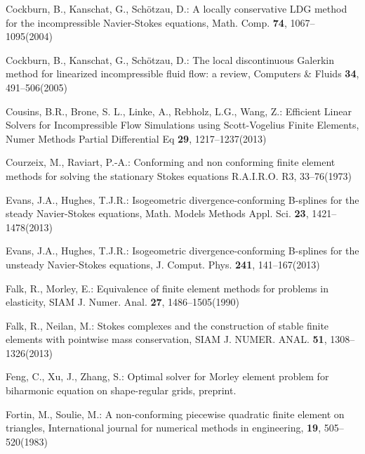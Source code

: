 \documentclass[12pt,showkeys]{amsart}
\begin{document}
\begin{thebibliography}{000}
\newblock Cockburn, B., Kanschat, G., Sch\"otzau, D.:
\rm{A locally conservative LDG method for the incompressible Navier-Stokes equations}, Math. Comp. \textbf{74}, 1067--1095(2004)

\newblock Cockburn, B., Kanschat, G., Sch\"otzau, D.: 
\rm{The local discontinuous Galerkin method for linearized incompressible fluid flow: a review}, Computers \& Fluids \textbf{34}, 491--506(2005)

\newblock Cousins, B.R., Brone, S. L., Linke, A., Rebholz, L.G., Wang, Z.:
\rm{Efficient Linear Solvers for Incompressible Flow
Simulations using Scott-Vogelius Finite Elements}, Numer Methods Partial Differential Eq \textbf{29}, 1217--1237(2013)

\newblock Courzeix, M., Raviart, P.-A.:
\rm{Conforming and non conforming finite element methods for solving the stationary Stokes equations} R.A.I.R.O. R3, 33--76(1973)

\newblock Evans, J.A., Hughes, T.J.R.: 
\rm{Isogeometric divergence-conforming B-splines for the steady Navier-Stokes equations}, Math. Models Methods Appl. Sci. \textbf{23}, 1421--1478(2013)

\newblock Evans, J.A., Hughes, T.J.R.:
\rm{Isogeometric divergence-conforming B-splines for the unsteady Navier-Stokes equations}, J. Comput. Phys. \textbf{241}, 141--167(2013)

\newblock Falk, R., Morley, E.:
\rm{Equivalence of finite element methods for problems in elasticity}, SIAM J. Numer. Anal. \textbf{27}, 1486--1505(1990)

\newblock Falk, R., Neilan, M.:
\rm{Stokes complexes and the construction of stable finite elements with pointwise mass conservation}, SIAM J. NUMER. ANAL. \textbf{51}, 1308--1326(2013)

\newblock Feng, C., Xu, J., Zhang, S.:
\rm{Optimal solver for Morley element problem for biharmonic equation on shape-regular grids}, preprint.

\newblock Fortin, M., Soulie, M.:
\rm{A non-conforming piecewise quadratic finite element on triangles}, International journal for numerical methods in engineering, \textbf{19}, 505--520(1983)


\end{thebibliography}
\end{document}
